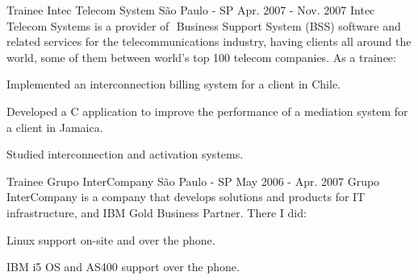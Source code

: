 \begin{cventries}
    \cventry
    {Trainee} %
    {Intec Telecom System} %
    {São Paulo - SP} %
    {Apr. 2007 - Nov. 2007} %
    {
      Intec Telecom Systems is a provider of ​ Business Support System (BSS)​ software and related services for the
      telecommunications industry, having clients all around the world, some of them between world’s top 100 telecom
      companies. As a trainee:
    }
    {
      \begin{cvitems} %
            \item {Implemented an interconnection billing system for a client in 
                  Chile.}
            \item {Developed a C application to improve the performance of a 
                  mediation system for a client in Jamaica.}
            \item {Studied interconnection and activation systems.}
      \end{cvitems}
    }

    \cventry
    {Trainee} %
    {Grupo InterCompany} %
    {São Paulo - SP} %
    {May 2006 - Apr. 2007} %
    {
      Grupo InterCompany is a company that develops solutions and products for IT infrastructure, and IBM Gold
      Business Partner. There I did:
    }
    {
      \begin{cvitems} %
            \item {Linux support on-site and over the phone.}
            \item {IBM i5 OS and AS400 support over the phone.}
      \end{cvitems}
    }

\end{cventries}